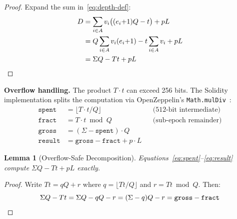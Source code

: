 \documentclass[10pt,a4paper,twocolumn]{article}
\theoremstyle{definition}
\theoremstyle{plain}
\newtheorem{lemma}[theorem]{Lemma}
\theoremstyle{remark}
\begin{document}
\begin{proof}
Expand the sum in~\eqref{eq:depth-def}:
\begin{align*}
D &= \sum_{i \in A} v_i \bigl((e_i{+}1)Q - t\bigr) + p L \\
  &= Q \sum_{i \in A} v_i(e_i{+}1) - t \sum_{i \in A} v_i + p L \\
  &= \Sigma Q - T t + p L \qedhere
\end{align*}
\end{proof}

\textbf{Overflow handling.} The product $T \cdot t$ can exceed 256 bits. The Solidity implementation splits the computation via OpenZeppelin's \texttt{Math.mulDiv}~\cite{oz-math}:
\begin{align}
\texttt{spent}  &= \lfloor T \cdot t / Q \rfloor & &\text{(512-bit intermediate)} \label{eq:spent} \\
\texttt{fract}  &= T \cdot t \bmod Q & &\text{(sub-epoch remainder)} \label{eq:fract} \\
\texttt{gross}  &= (\Sigma - \texttt{spent}) \cdot Q \label{eq:gross} \\
\texttt{result} &= \texttt{gross} - \texttt{fract} + p \cdot L \label{eq:result}
\end{align}

\begin{lemma}[Overflow-Safe Decomposition]
\label{lem:overflow}
Equations~\eqref{eq:spent}--\eqref{eq:result} compute $\Sigma Q - T t + pL$ exactly.
\end{lemma}

\begin{proof}
Write $Tt = qQ + r$ where $q = \lfloor Tt/Q \rfloor$ and $r = Tt \bmod Q$. Then:
\[
\Sigma Q - Tt = \Sigma Q - qQ - r = (\Sigma - q)Q - r = \texttt{gross} - \texttt{fract} \qedhere
\]
\end{proof}
\end{document}
